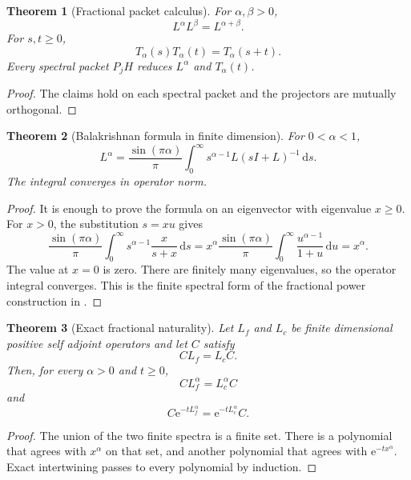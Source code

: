 \documentclass[11pt,a4paper]{article}
\newtheorem{theorem}{Theorem}[section]
\theoremstyle{definition}
\theoremstyle{remark}
\newcommand{\e}{\mathrm e}
\newcommand{\dd}{\,\mathrm d}
\begin{document}
\begin{theorem}[Fractional packet calculus]\label{extended:record:067}\label{extended:thm:fractional_packet_calculus}
For \(\alpha,\beta>0\),
\[
L^\alpha L^\beta=L^{\alpha+\beta}.
\]
For \(s,t\geq0\),
\[
T_\alpha(s)T_\alpha(t)=T_\alpha(s+t).
\]
Every spectral packet \(P_jH\) reduces \(L^\alpha\) and \(T_\alpha(t)\).
\end{theorem}

\begin{proof}
The claims hold on each spectral packet and the projectors are mutually orthogonal.
\end{proof}

\begin{theorem}[Balakrishnan formula in finite dimension]\label{extended:record:068}\label{extended:thm:balakrishnan}
For \(0<\alpha<1\),
\[
L^\alpha
=
\frac{\sin(\pi\alpha)}{\pi}
\int_0^\infty
s^{\alpha-1}L(sI+L)^{-1}
\dd s.
\]
The integral converges in operator norm.
\end{theorem}

\begin{proof}
It is enough to prove the formula on an eigenvector with eigenvalue \(x\geq0\). For \(x>0\), the substitution \(s=xu\) gives
\[
\frac{\sin(\pi\alpha)}{\pi}
\int_0^\infty
s^{\alpha-1}\frac{x}{s+x}\dd s
=x^\alpha
\frac{\sin(\pi\alpha)}{\pi}
\int_0^\infty\frac{u^{\alpha-1}}{1+u}\dd u
=x^\alpha.
\]
The value at \(x=0\) is zero. There are finitely many eigenvalues, so the operator integral converges. This is the finite spectral form of the fractional power construction in \cite{Balakrishnan1960}.
\end{proof}

\begin{theorem}[Exact fractional naturality]\label{extended:record:069}\label{extended:thm:exact_fractional_naturality}
Let \(L_f\) and \(L_c\) be finite dimensional positive self adjoint operators and let \(C\) satisfy
\[
CL_f=L_cC.
\]
Then, for every \(\alpha>0\) and \(t\geq0\),
\[
CL_f^\alpha=L_c^\alpha C
\]
and
\[
C\e^{-tL_f^\alpha}
=
\e^{-tL_c^\alpha}C.
\]
\end{theorem}

\begin{proof}
The union of the two finite spectra is a finite set. There is a polynomial that agrees with \(x^\alpha\) on that set, and another polynomial that agrees with \(\e^{-tx^\alpha}\). Exact intertwining passes to every polynomial by induction.
\end{proof}
\end{document}
